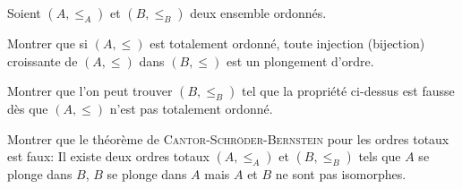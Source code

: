 \documentclass[french]{report}
\begin{document}
\begin{exo}
    Soient \(\left(A,\leq_A\right)\) et \(\left(B,\leq_B\right)\) deux ensemble ordonnés.
    \begin{q}{1}
        Montrer que si \(\left(A,\leq\right)\) est totalement ordonné, toute injection
        (bijection) croissante de \(\left(A,\leq\right)\) dans \(\left(B,\leq\right)\)
        est un plongement d'ordre.
    \end{q}
    \begin{q}{2}
        Montrer que l'on peut trouver \(\left(B,\leq_B\right)\) tel que la propriété
        ci-dessus est fausse dès que \(\left(A,\leq\right)\) n'est pas totalement
        ordonné.
    \end{q}
    \begin{q}{3}
        Montrer que le théorème de \textsc{Cantor-Schröder-Bernstein} pour les ordres
        totaux est faux: Il existe deux ordres totaux \(\left(A,\leq_A\right)\) et
        \(\left(B,\leq_B\right)\) tels que \(A\) se plonge dans \(B\), \(B\) se plonge
        dans \(A\) mais \(A\) et \(B\) ne sont pas isomorphes.
        \boxans{}
    \end{q}
\end{exo}
\end{document}
